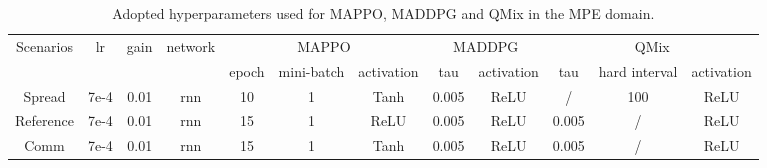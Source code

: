 \begin{table}[]
\centering
\begin{adjustwidth}{-.3in}{-.5in}
\begin{tabular}{cccccccccccc}
\toprule
\multirow{2}{*}{Scenarios} & \multirow{2}{*}{lr} & \multirow{2}{*}{gain} &   \multirow{2}{*}{network} & \multicolumn{3}{c}{MAPPO}                    & \multicolumn{2}{c}{MADDPG} & \multicolumn{3}{c}{QMix}          \\ \cmidrule{5-12} 
 &      &       &     & epoch & mini-batch & activation & tau        & activation     & tau   & hard interval & activation \\ \midrule
Spread                     & 7e-4                & 0.01      & rnn            & 10        & 1          & Tanh          & 0.005      & ReLU           & /     & 100           & ReLU       \\ 
Reference                  & 7e-4                & 0.01        & rnn          & 15        & 1          & ReLU          & 0.005      & ReLU           & 0.005 & /             & ReLU       \\ 
Comm                       & 7e-4                & 0.01     & rnn             & 15        & 1          & Tanh          & 0.005      & ReLU           & 0.005 & /             & ReLU       \\ \bottomrule
\end{tabular}
\end{adjustwidth}
\caption{Adopted hyperparameters used for MAPPO, MADDPG and QMix in the MPE domain.}
\label{tab:diff-MPE}
\end{table}




